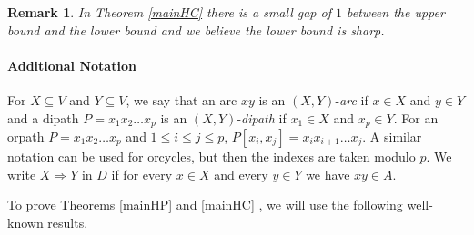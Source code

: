 \documentclass{article}
\newcommand{\2}{\vspace{2mm}}
\newtheorem{theorem}{Theorem}[section]
\newtheorem{remark}[theorem]{Remark}
\theoremstyle{definition}
\begin{document}
\begin{remark} 
In Theorem \ref{mainHC} there is a small gap of $1$ between the upper bound and the lower bound and we believe the lower bound is sharp.
\end{remark}



\paragraph{Additional Notation}
For $X\subseteq V$ and $Y\subseteq V$, we say that an arc $xy$ is an $(X,Y)$-{\em arc} if $x\in X$ and $y\in Y$ and a dipath $P=x_1x_2\dots x_p$ is an $(X,Y)$-{\em dipath} if $x_1\in X$ and $x_p\in Y.$ For an orpath $P=x_1x_2\dots x_p$ and $1\le i\le j\le p$, $P[x_i,x_j]=x_ix_{i+1}\dots x_j$. A similar notation can be used for orcycles, but then the indexes are taken modulo $p.$ 
We write $X \Rightarrow Y$ in $D$ if for every $x \in X$ and every $y \in Y$ we have $xy \in A$.







\2



To prove Theorems \ref{mainHP} and \ref{mainHC} , we will use the following well-known results.

\end{document}
